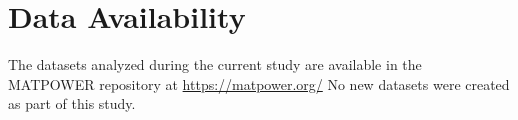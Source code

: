 \section*{Data Availability}

The datasets analyzed during the current study are available in the MATPOWER repository \cite{matpower} at \href{https://matpower.org/}{https://matpower.org/} 
No new datasets were created as part of this study.
